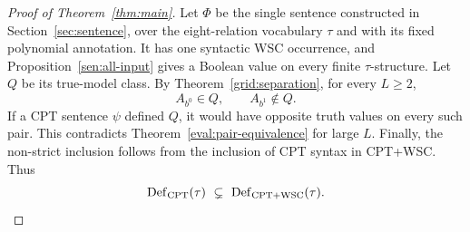 \begin{proof}[Proof of Theorem~\ref{thm:main}]
Let \(\Phi\) be the single sentence constructed in
Section~\ref{sec:sentence}, over the eight-relation vocabulary \(\tau\)
and with its fixed polynomial annotation. It has one syntactic WSC
occurrence, and Proposition~\ref{sen:all-input} gives a Boolean value
on every finite \(\tau\)-structure. Let \(Q\) be its true-model class.
By Theorem~\ref{grid:separation}, for every \(L\ge2\),
\[
              A_{b^0}\in Q,\qquad A_{b^1}\notin Q.
\]
If a CPT sentence \(\psi\) defined \(Q\), it would have opposite truth
values on every such pair.  This contradicts
Theorem~\ref{eval:pair-equivalence} for large \(L\).
Finally, the non-strict inclusion follows from the inclusion of CPT
syntax in CPT+WSC. Thus
\[
       \operatorname{Def}_{\mathrm{CPT}}(\tau)
         \ \subsetneq\
       \operatorname{Def}_{\mathrm{CPT}+\mathrm{WSC}}(\tau).
\]
\end{proof}
